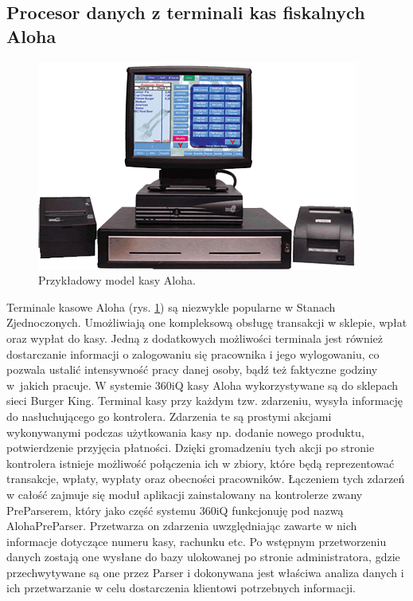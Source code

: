 \documentclass[a4paper]{book}
\begin{document}
\subsection{Procesor danych z terminali kas fiskalnych Aloha}
\begin{figure}[t]
	\centering
	\includegraphics[width=\textwidth]{./img/aloha_pos.png}
	\caption{Przykładowy model kasy Aloha.}
	\label{fig:aloha_pos}
\end{figure}
Terminale kasowe Aloha (rys. \ref{fig:aloha_pos}) są niezwykle popularne w Stanach Zjednoczonych. Umożliwiają one kompleksową obsługę transakcji w sklepie, wpłat oraz wypłat do kasy. Jedną z dodatkowych możliwości terminala jest również dostarczanie informacji o zalogowaniu się pracownika i jego wylogowaniu, co pozwala ustalić intensywność pracy danej osoby, bądź też faktyczne godziny w~jakich pracuje. W systemie 360iQ kasy Aloha wykorzystywane są do sklepach sieci Burger King. Terminal kasy przy każdym tzw. zdarzeniu, wysyła informację do nasłuchującego go kontrolera. Zdarzenia te są prostymi akcjami wykonywanymi podczas użytkowania kasy np. dodanie nowego produktu, potwierdzenie przyjęcia płatności. Dzięki gromadzeniu tych akcji po stronie kontrolera istnieje możliwość połączenia ich w zbiory, które będą reprezentować transakcje, wpłaty, wypłaty oraz obecności pracowników. Łączeniem tych zdarzeń w całość zajmuje się moduł aplikacji zainstalowany na kontrolerze zwany PreParserem, który jako część systemu 360iQ funkcjonuję pod nazwą AlohaPreParser. Przetwarza on zdarzenia uwzględniając zawarte w nich informacje dotyczące numeru kasy, rachunku etc.
Po wstępnym przetworzeniu danych zostają one wysłane do bazy ulokowanej po stronie administratora, gdzie przechwytywane są one przez Parser i dokonywana jest właściwa analiza danych i ich przetwarzanie w celu dostarczenia klientowi potrzebnych informacji. 
\newpage
\end{document}
